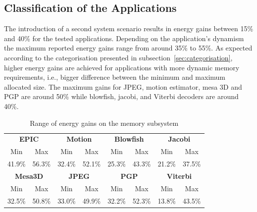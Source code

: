 \documentclass[smallcondensed]{svjour3}
\begin{document}
\subsection{Classification of the Applications}

The introduction of a second system scenario results in energy gains between 15\% and  40\%  for the tested applications. 
Depending on the application's dynamism the maximum reported energy gains range from around 35\% to 55\%. 
As expected according to the categorisation presented in subsection~\ref{sec:categorisation}, higher energy gains are achieved for applications with more dynamic memory requirements, i.e., bigger difference between the minimum and maximum allocated size. 
The maximum gains for JPEG, motion estimator, mesa 3D and PGP are around 50\% while blowfish, jacobi, and Viterbi decoders are around 40\%.

\begin{center}
	\begin{table}
	\caption{Range of energy gains on the memory subsystem}
	\label{tab:ranges}
	{
	\begin{tabular}{|c|c|c|c|c|c|c|c|}
		\hline
		\multicolumn{2}{|c|}{\textbf{EPIC}} &
		\multicolumn{2}{c|}{\textbf{Motion}} &
		\multicolumn{2}{c|}{\textbf{Blowfish}} &
		\multicolumn{2}{c|}{\textbf{Jacobi}}
		\\ 
		\cline{1-8}
		Min & Max & Min & Max & Min & Max & 
		Min & Max \\ 
		\hline 
		41.9\% & 56.3\% & 32.4\% & 52.1\% & 25.3\% & 43.3\% & 
		21.2\% & 37.5\% \\ 
		\hline 

		\multicolumn{2}{|c|}{\textbf{Mesa3D}} &
		\multicolumn{2}{c|}{\textbf{JPEG}} &
		\multicolumn{2}{c|}{\textbf{PGP}} &
		\multicolumn{2}{c|}{\textbf{Viterbi}} \\ 
		\cline{1-8}
		Min & Max & Min & Max & Min & Max & 
		Min & Max \\ 
		\hline 
		32.5\% & 50.8\% & 33.0\% & 49.9\% & 
		32.2\% & 52.3\% & 13.8\% & 43.5\% \\ 
		\hline 
		
	\end{tabular}}
	\end{table}
\end{center}
\end{document}
